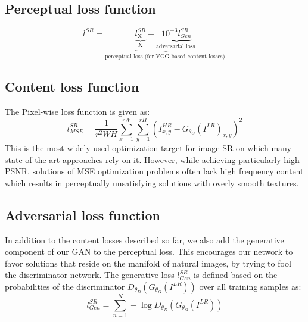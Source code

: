 \subsection{Perceptual loss function}
\begin{equation}
l^{S R}=\underbrace{\underbrace{l_{\mathrm{X}}^{S R}}_{\mathrm{X}}+\underbrace{10^{-3} l_{G e n}^{S R}}_{\text {adversarial loss }}}_{\text {perceptual loss (for VGG based content losses) }}
\end{equation}
\subsection{Content loss function}
The Pixel-wise loss function is given as:
\begin{equation}
l_{M S E}^{S R}=\frac{1}{r^2 W H} \sum_{x=1}^{r W} \sum_{y=1}^{r H}\left(I_{x, y}^{H R}-G_{\theta_G}\left(I^{L R}\right)_{x, y}\right)^2
\end{equation}
This is the most widely used optimization target for image
SR on which many state-of-the-art approaches rely on it. However, while achieving particularly high PSNR, solutions of MSE optimization problems often lack high frequency content which results in perceptually unsatisfying solutions with overly smooth textures.
\subsection{Adversarial loss function}
In addition to the content losses described so far, we also
add the generative component of our GAN to the perceptual
loss. This encourages our network to favor solutions that
reside on the manifold of natural images, by trying to fool the discriminator network. The generative loss ${l_{G e n}^{S R}}$ is defined based on the probabilities of the discriminator ${D_{\theta_D}\left(G_{\theta_G}\left(I^{L R}\right)\right)}$ over all training samples as:
\begin{equation}
l_{G e n}^{S R}=\sum_{n=1}^N-\log D_{\theta_D}\left(G_{\theta_G}\left(I^{L R}\right)\right)
\end{equation}




